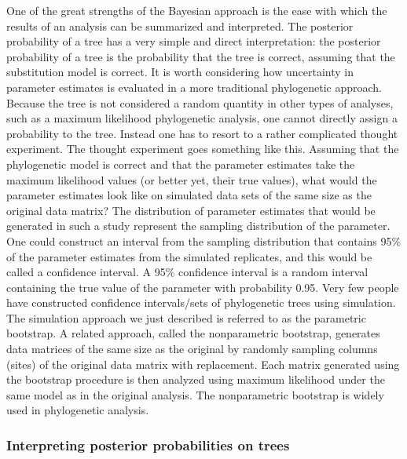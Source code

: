 \documentclass{svmult}
\begin{document}
One of the great strengths of the Bayesian approach is the ease with which the results of an
analysis can be summarized and interpreted. The posterior probability of a tree has a very simple
and direct interpretation: the posterior probability of a tree is the probability that the tree is
correct, assuming that the substitution model is correct.  It is worth considering how uncertainty
in parameter estimates is evaluated in a more traditional phylogenetic approach. Because the tree
is not considered a random quantity in other types of analyses, such as a maximum likelihood
phylogenetic analysis, one cannot directly assign a probability to the tree.  Instead one has to
resort to a rather complicated thought experiment. The thought experiment goes something like this.
Assuming that the phylogenetic model is correct and that the parameter estimates take the maximum
likelihood values (or better yet, their true values), what would the parameter estimates look like
on simulated data sets of the same size as the original data matrix? The distribution of parameter
estimates that would be generated in such a study represent the sampling distribution of the
parameter. One could construct an interval from the sampling distribution that contains 95\% of the
parameter estimates from the simulated replicates, and this would be called a confidence interval.
A 95\% confidence interval is a random interval containing the true value of the parameter with
probability 0.95. Very few people have constructed confidence intervals/sets of phylogenetic trees
using simulation. The simulation approach we just described is referred to as the parametric
bootstrap.  A related approach, called the nonparametric bootstrap, generates data matrices of the
same size as the original by randomly sampling columns (sites) of the original data matrix with
replacement. Each matrix generated using the bootstrap procedure is then analyzed using maximum
likelihood under the same model as in the original analysis. The nonparametric bootstrap is widely
used in phylogenetic analysis.

\subsubsection{Interpreting posterior probabilities on trees}
\end{document}
